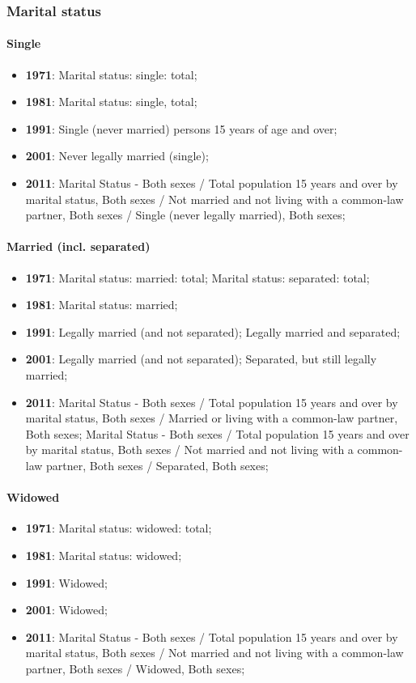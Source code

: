 \documentclass[a4paper]{article}
\begin{document}
\subsubsection{Marital status}
\paragraph{Single}
\begin{itemize}
   \item{\textbf{1971}:  Marital status: single: total;}
   \item{\textbf{1981}:  Marital status: single, total;}
   \item{\textbf{1991}:  Single (never married) persons 15 years of age and over;}
   \item{\textbf{2001}:  Never legally married (single);}
   \item{\textbf{2011}:  Marital Status - Both sexes / Total population 15 years and over by marital status, Both sexes / Not married and not living with a common-law partner, Both sexes / Single (never legally married), Both sexes;}
\end{itemize}

\paragraph{Married (incl. separated)}
\begin{itemize}
   \item{\textbf{1971}:  Marital status: married: total; Marital status: separated: total;}
   \item{\textbf{1981}:  Marital status: married;}
   \item{\textbf{1991}:  Legally married (and not separated); Legally married and separated;}
   \item{\textbf{2001}:  Legally married (and not separated); Separated, but still legally married;}
   \item{\textbf{2011}:  Marital Status - Both sexes / Total population 15 years and over by marital status, Both sexes / Married or living with a common-law partner, Both sexes; Marital Status - Both sexes / Total population 15 years and over by marital status, Both sexes / Not married and not living with a common-law partner, Both sexes / Separated, Both sexes;}
\end{itemize}

\paragraph{Widowed}
\begin{itemize}
   \item{\textbf{1971}:  Marital status: widowed: total;}
   \item{\textbf{1981}:  Marital status: widowed;}
   \item{\textbf{1991}:  Widowed;}
   \item{\textbf{2001}:  Widowed;}
   \item{\textbf{2011}:  Marital Status - Both sexes / Total population 15 years and over by marital status, Both sexes / Not married and not living with a common-law partner, Both sexes / Widowed, Both sexes;}
\end{itemize}
\end{document}
